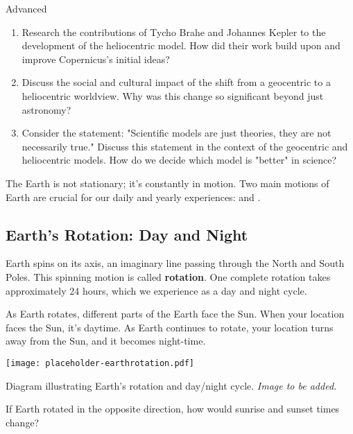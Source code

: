 \begin{tieredquestions}{Advanced}
\begin{enumerate}
    \item Research the contributions of Tycho Brahe and Johannes Kepler to the development of the heliocentric model. How did their work build upon and improve Copernicus's initial ideas?
    \item Discuss the social and cultural impact of the shift from a geocentric to a heliocentric worldview. Why was this change so significant beyond just astronomy?
    \item  Consider the statement: "Scientific models are just theories, they are not necessarily true."  Discuss this statement in the context of the geocentric and heliocentric models. How do we decide which model is "better" in science?
\end{enumerate}
\end{tieredquestions}


\FloatBarrier
\1

The Earth is not stationary; it's constantly in motion.  Two main motions of Earth are crucial for our daily and yearly experiences:  and .

\subsection{Earth's Rotation: Day and Night}

Earth spins on its axis, an imaginary line passing through the North and South Poles. This spinning motion is called \textbf{rotation}. One complete rotation takes approximately 24 hours, which we experience as a day and night cycle.

As Earth rotates, different parts of the Earth face the Sun. When your location faces the Sun, it's daytime. As Earth continues to rotate, your location turns away from the Sun, and it becomes night-time.

\begin{marginfigure}
\texttt{[image: placeholder-earthrotation.pdf]}
\caption{\label{fig:earthrotation}Diagram illustrating Earth's rotation and day/night cycle. \textit{Image to be added.}}
\end{marginfigure}

\begin{stopandthink}
If Earth rotated in the opposite direction, how would sunrise and sunset times change?
\end{stopandthink}


